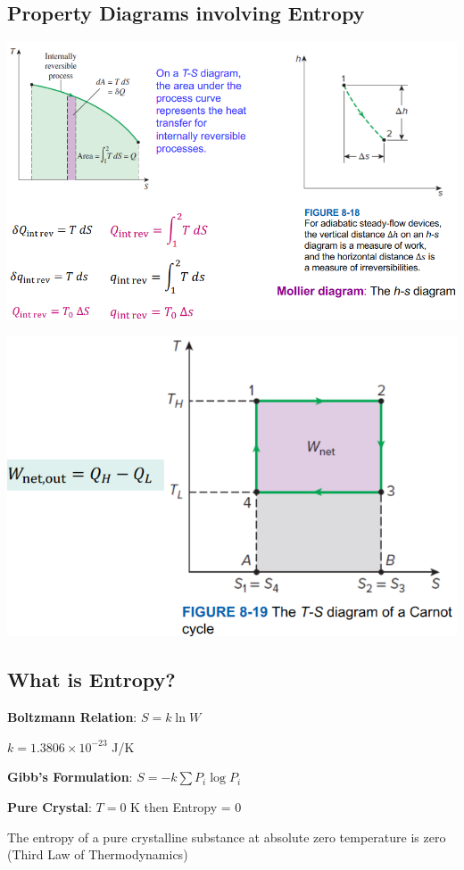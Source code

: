 \documentclass{article}
\begin{document}
\begin{multicols}{3}
    \subsection*{Property Diagrams involving Entropy}
    \includegraphics[width=\linewidth]{Images/Diagrams1.png}\par 
    \includegraphics[width=0.5\linewidth]{Images/Diagrams2.png}
    \subsection*{What is Entropy?}
    \textbf{Boltzmann Relation}: $S=k\ln{W}$\par 
    $k=1.3806\times 10^{-23}$ J/K\par 
    \textbf{Gibb's Formulation}: $S=-k\sum P_i\log{P_i}$\par 
    \textbf{Pure Crystal}: $T=0$ K then Entropy = 0\par The entropy of a pure crystalline substance at absolute zero temperature is zero (Third Law of Thermodynamics)

\end{multicols}
\end{document}
